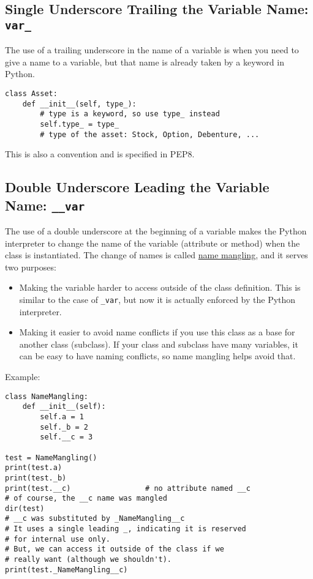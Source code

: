 \documentclass[12pt, a4paper]{article}
\begin{document}
\subsection{Single Underscore Trailing the Variable Name: \texttt{var\_}}
\label{sec:orgf102670}
The use of a trailing underscore in the name of a variable is when you need to give a name to a variable, but that name is already taken by a keyword in Python.
\lstset{language=jupyter-python,label= ,caption= ,captionpos=b,numbers=none}
\begin{lstlisting}
class Asset:
    def __init__(self, type_):
        # type is a keyword, so use type_ instead
        self.type_ = type_
        # type of the asset: Stock, Option, Debenture, ...
\end{lstlisting}
This is also a convention and is specified in PEP8.
\subsection{Double Underscore Leading the Variable Name: \texttt{\_\_var}}
\label{sec:org4caec4c}
The use of a double underscore at the beginning of a variable makes the Python interpreter to change the name of the variable (attribute or method) when the class is instantiated.
The change of names is called \uline{name mangling}, and it serves two purposes:
\begin{itemize}
\item Making the variable harder to access outside of the class definition. This is similar to the case of \texttt{\_var}, but now it is actually enforced by the Python interpreter.
\item Making it easier to avoid name conflicts if you use this class as a base for another class (subclass). If your class and subclass have many variables, it can be easy to have naming conflicts, so name mangling helps avoid that.
\end{itemize}
Example:
\lstset{language=jupyter-python,label= ,caption= ,captionpos=b,numbers=none}
\begin{lstlisting}
class NameMangling:
    def __init__(self):
        self.a = 1
        self._b = 2
        self.__c = 3

test = NameMangling()
print(test.a)
print(test._b)
print(test.__c)                 # no attribute named __c
# of course, the __c name was mangled
dir(test)
# __c was substituted by _NameMangling__c
# It uses a single leading _, indicating it is reserved
# for internal use only.
# But, we can access it outside of the class if we
# really want (although we shouldn't).
print(test._NameMangling__c)
\end{lstlisting}
\end{document}
